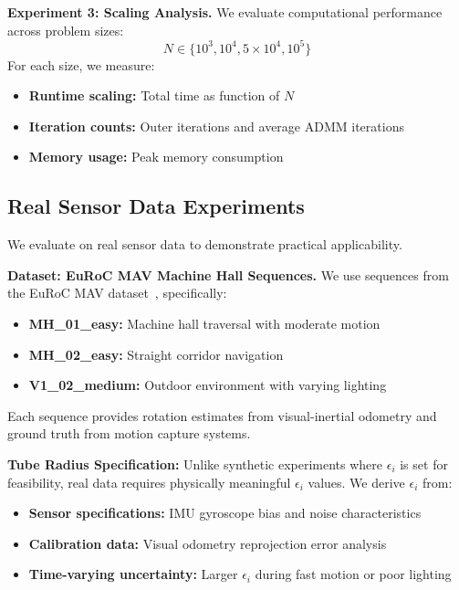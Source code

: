 \textbf{Experiment 3: Scaling Analysis.} We evaluate computational performance across problem sizes:
\begin{equation}
N \in \{10^3, 10^4, 5 \times 10^4, 10^5\}
\end{equation}
For each size, we measure:
\begin{itemize}
\item \textbf{Runtime scaling:} Total time as function of $N$
\item \textbf{Iteration counts:} Outer iterations and average ADMM iterations
\item \textbf{Memory usage:} Peak memory consumption
\end{itemize}

\subsection{Real Sensor Data Experiments}

We evaluate on real sensor data to demonstrate practical applicability.

\textbf{Dataset: EuRoC MAV Machine Hall Sequences.} We use sequences from the EuRoC MAV dataset~\cite{euroc}, specifically:
\begin{itemize}
\item \textbf{MH\_01\_easy:} Machine hall traversal with moderate motion
\item \textbf{MH\_02\_easy:} Straight corridor navigation
\item \textbf{V1\_02\_medium:} Outdoor environment with varying lighting
\end{itemize}

Each sequence provides rotation estimates from visual-inertial odometry and ground truth from motion capture systems.

\textbf{Tube Radius Specification:} Unlike synthetic experiments where $\epsilon_i$ is set for feasibility, real data requires physically meaningful $\epsilon_i$ values. We derive $\epsilon_i$ from:

\begin{itemize}
\item \textbf{Sensor specifications:} IMU gyroscope bias and noise characteristics
\item \textbf{Calibration data:} Visual odometry reprojection error analysis
\item \textbf{Time-varying uncertainty:} Larger $\epsilon_i$ during fast motion or poor lighting
\end{itemize}


